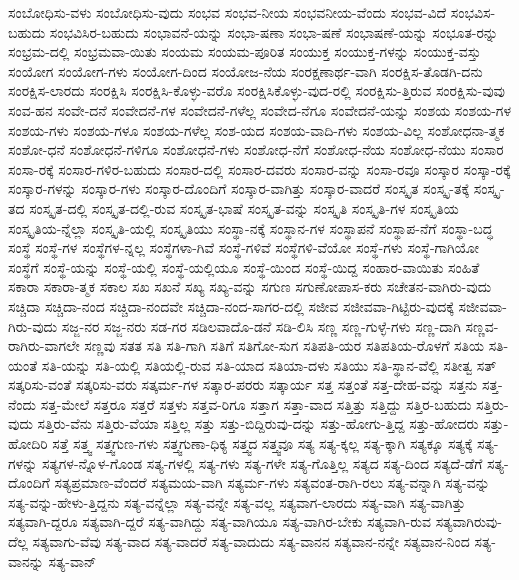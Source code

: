 {ಸಂಬೋಧಿಸು-ವಳು
ಸಂಬೋಧಿಸು-ವುದು
ಸಂಭವ
ಸಂಭವ-ನೀಯ
ಸಂಭವನೀಯ-ವೆಂದು
ಸಂಭವ-ವಿದೆ
ಸಂಭವಿಸ-ಬಹುದು
ಸಂಭವಿಸಿರ-ಬಹುದು
ಸಂಭಾವನೆ-ಯನ್ನು
ಸಂಭಾ-ಷಣಾ
ಸಂಭಾ-ಷಣೆ
ಸಂಭಾಷಣೆ-ಯನ್ನು
ಸಂಭೂತ-ರನ್ನು
ಸಂಭ್ರಮ-ದಲ್ಲಿ
ಸಂಭ್ರಮವಾ-ಯಿತು
ಸಂಯಮ
ಸಂಯಮ-ಪೂರಿತ
ಸಂಯುಕ್ತ
ಸಂಯುಕ್ತ-ಗಳನ್ನು
ಸಂಯುಕ್ತ-ವಸ್ತು
ಸಂಯೋಗ
ಸಂಯೋಗ-ಗಳು
ಸಂಯೋಗ-ದಿಂದ
ಸಂಯೋಜ-ನೆಯ
ಸಂರಕ್ಷಣಾರ್ಥ-ವಾಗಿ
ಸಂರಕ್ಷಿಸ-ತೊಡಗಿ-ದನು
ಸಂರಕ್ಷಿಸ-ಲಾರದು
ಸಂರಕ್ಷಿಸಿ
ಸಂರಕ್ಷಿಸಿ-ಕೊಳ್ಳು-ವರೊ
ಸಂರಕ್ಷಿಸಿಕೊಳ್ಳು-ವುದ-ರಲ್ಲಿ
ಸಂರಕ್ಷಿಸು-ತ್ತಿರುವ
ಸಂರಕ್ಷಿಸು-ವುವು
ಸಂವ-ಹನ
ಸಂವೇ-ದನೆ
ಸಂವೇದನೆ-ಗಳ
ಸಂವೇದನೆ-ಗಳೆಲ್ಲ
ಸಂವೇದ-ನೆಗೂ
ಸಂವೇದನೆ-ಯನ್ನು
ಸಂಶಯ
ಸಂಶಯ-ಗಳ
ಸಂಶಯ-ಗಳು
ಸಂಶಯ-ಗಳೂ
ಸಂಶಯ-ಗಳೆಲ್ಲ
ಸಂಶ-ಯದ
ಸಂಶಯ-ವಾದಿ-ಗಳು
ಸಂಶಯ-ವಿಲ್ಲ
ಸಂಶೋಧನಾ-ತ್ಮಕ
ಸಂಶೋ-ಧನೆ
ಸಂಶೋಧನೆ-ಗಳಿಗೂ
ಸಂಶೋಧನೆ-ಗಳು
ಸಂಶೋಧ-ನೆಗೆ
ಸಂಶೋಧ-ನೆಯ
ಸಂಶೋಧ-ನೆಯು
ಸಂಸಾರ
ಸಂಸಾ-ರಕ್ಕೆ
ಸಂಸಾರ-ಗಳಿರ-ಬಹುದು
ಸಂಸಾರ-ದಲ್ಲಿ
ಸಂಸಾರ-ದವರು
ಸಂಸಾರ-ವನ್ನು
ಸಂಸಾ-ರವೂ
ಸಂಸ್ಕಾರ
ಸಂಸ್ಕಾ-ರಕ್ಕೆ
ಸಂಸ್ಕಾರ-ಗಳನ್ನು
ಸಂಸ್ಕಾರ-ಗಳು
ಸಂಸ್ಕಾರ-ದೊಂದಿಗೆ
ಸಂಸ್ಕಾರ-ವಾಗಿತ್ತು
ಸಂಸ್ಕಾರ-ವಾದರೆ
ಸಂಸ್ಕೃತ
ಸಂಸ್ಕೃ-ತಕ್ಕೆ
ಸಂಸ್ಕೃ-ತದ
ಸಂಸ್ಕೃತ-ದಲ್ಲಿ
ಸಂಸ್ಕೃತ-ದಲ್ಲಿ-ರುವ
ಸಂಸ್ಕೃತ-ಭಾಷೆ
ಸಂಸ್ಕೃತ-ವನ್ನು
ಸಂಸ್ಕೃತಿ
ಸಂಸ್ಕೃತಿ-ಗಳ
ಸಂಸ್ಕೃತಿಯ
ಸಂಸ್ಕೃತಿಯ-ನ್ನೆಲ್ಲಾ
ಸಂಸ್ಕೃತಿ-ಯಲ್ಲಿ
ಸಂಸ್ಕೃತಿಯು
ಸಂಸ್ಥಾ-ನಕ್ಕೆ
ಸಂಸ್ಥಾನ-ಗಳ
ಸಂಸ್ಥಾಪನೆ
ಸಂಸ್ಥಾಪ-ನೆಗೆ
ಸಂಸ್ಥಾ-ಬದ್ಧ
ಸಂಸ್ಥೆ
ಸಂಸ್ಥೆ-ಗಳ
ಸಂಸ್ಥೆಗಳ-ನ್ನಲ್ಲ
ಸಂಸ್ಥೆಗಳಾ-ಗಿವೆ
ಸಂಸ್ಥೆ-ಗಳಿವೆ
ಸಂಸ್ಥೆಗಳಿ-ವೆಯೋ
ಸಂಸ್ಥೆ-ಗಳು
ಸಂಸ್ಥೆ-ಗಾಗಿಯೋ
ಸಂಸ್ಥೆಗೆ
ಸಂಸ್ಥೆ-ಯನ್ನು
ಸಂಸ್ಥೆ-ಯಲ್ಲಿ
ಸಂಸ್ಥೆ-ಯಲ್ಲಿಯೂ
ಸಂಸ್ಥೆ-ಯಿಂದ
ಸಂಸ್ಥೆ-ಯಿದ್ದ
ಸಂಹಾರ-ವಾಯಿತು
ಸಂಹಿತೆ
ಸಕಾರಾ
ಸಕಾರಾ-ತ್ಮಕ
ಸಕಾಲ
ಸಖ
ಸಖನೆ
ಸಖ್ಯ
ಸಖ್ಯ-ವನ್ನು
ಸಗುಣ
ಸಗುಣೋಪಾಸ-ಕರು
ಸಚೇತನ-ವಾಗಿರು-ವುದು
ಸಚ್ಚಿದಾ
ಸಚ್ಚಿದಾ-ನಂದ
ಸಚ್ಚಿದಾ-ನಂದವೇ
ಸಚ್ಚಿದಾ-ನಂದ-ಸಾಗರ-ದಲ್ಲಿ
ಸಜೀವ
ಸಜೀವವಾ-ಗಿಟ್ಟಿರು-ವುದಕ್ಕೆ
ಸಜೀವವಾ-ಗಿರು-ವುದು
ಸಜ್ಜ-ನರ
ಸಜ್ಜ-ನರು
ಸಡ-ಗರ
ಸಡಿಲವಾದೊ-ಡನೆ
ಸಡಿ-ಲಿಸಿ
ಸಣ್ಣ
ಸಣ್ಣ-ಗುಳ್ಳೆ-ಗಳು
ಸಣ್ಣ-ದಾಗಿ
ಸಣ್ಣವ-ರಾಗಿರು-ವಾಗಲೇ
ಸಣ್ಣವು
ಸತತ
ಸತಿ
ಸತಿ-ಗಾಗಿ
ಸತಿಗೆ
ಸತಿಗೋ-ಸುಗ
ಸತಿಪತಿ-ಯರ
ಸತಿಪತಿಯ-ರೊಳಗೆ
ಸತಿಯ
ಸತಿ-ಯಂತೆ
ಸತಿ-ಯನ್ನು
ಸತಿ-ಯಲ್ಲಿ
ಸತಿಯಲ್ಲಿ-ರುವ
ಸತಿ-ಯಾದ
ಸತಿಯಾ-ದಳು
ಸತಿಯು
ಸತಿ-ಸ್ಥಾನ-ವೆಲ್ಲಿ
ಸತೀತ್ವ
ಸತ್
ಸತ್ಕರಿಸು-ವಂತೆ
ಸತ್ಕರಿಸು-ವರು
ಸತ್ಕರ್ಮ-ಗಳ
ಸತ್ಕಾರ-ಪರರು
ಸತ್ಕಾರ್ಯ
ಸತ್ತ
ಸತ್ತಂತೆ
ಸತ್ತ-ದೇಹ-ವನ್ನು
ಸತ್ತನು
ಸತ್ತ-ನೆಂದು
ಸತ್ತ-ಮೇಲೆ
ಸತ್ತರೂ
ಸತ್ತರೆ
ಸತ್ತಳು
ಸತ್ತವ-ರಿಗೂ
ಸತ್ತಾಗ
ಸತ್ತಾ-ವಾದ
ಸತ್ತಿತ್ತು
ಸತ್ತಿದ್ದು
ಸತ್ತಿರ-ಬಹುದು
ಸತ್ತಿರು-ವುದು
ಸತ್ತಿರು-ವೆನು
ಸತ್ತಿರು-ವೆಯಾ
ಸತ್ತಿಲ್ಲ
ಸತ್ತು
ಸತ್ತು-ಬಿದ್ದಿರುವು-ದನ್ನು
ಸತ್ತು-ಹೋಗು-ತ್ತಿದ್ದ
ಸತ್ತು-ಹೋದರು
ಸತ್ತು-ಹೋದಿರಿ
ಸತ್ತೆ
ಸತ್ತ್ವ
ಸತ್ತ್ವಗುಣ-ಗಳು
ಸತ್ತ್ವಗುಣಾ-ಧಿಕ್ಯ
ಸತ್ತ್ವದ
ಸತ್ತ್ವವೂ
ಸತ್ಯ
ಸತ್ಯ-ಕ್ಕಲ್ಲ
ಸತ್ಯ-ಕ್ಕಾಗಿ
ಸತ್ಯಕ್ಕೂ
ಸತ್ಯಕ್ಕೆ
ಸತ್ಯ-ಗಳನ್ನು
ಸತ್ಯಗಳ-ನ್ನೊಳ-ಗೊಂಡ
ಸತ್ಯ-ಗಳಲ್ಲಿ
ಸತ್ಯ-ಗಳು
ಸತ್ಯ-ಗಳೇ
ಸತ್ಯ-ಗೊತ್ತಿಲ್ಲ
ಸತ್ಯದ
ಸತ್ಯ-ದಿಂದ
ಸತ್ಯದೆ-ಡೆಗೆ
ಸತ್ಯ-ದೊಂದಿಗೆ
ಸತ್ಯಪ್ರಮಾಣ-ವೆಂದರೆ
ಸತ್ಯಮಯ-ವಾಗಿ
ಸತ್ಯರ್ಮ-ಗಳು
ಸತ್ಯವಂತ-ರಾಗಿ-ರಲು
ಸತ್ಯ-ವನ್ನಾಗಿ
ಸತ್ಯ-ವನ್ನು
ಸತ್ಯ-ವನ್ನು-ಹೇಳು-ತ್ತಿದ್ದನು
ಸತ್ಯ-ವನ್ನೆಲ್ಲಾ
ಸತ್ಯ-ವನ್ನೇ
ಸತ್ಯ-ವಲ್ಲ
ಸತ್ಯವಾಗ-ಲಾರದು
ಸತ್ಯ-ವಾಗಿ
ಸತ್ಯ-ವಾಗಿತ್ತು
ಸತ್ಯವಾಗಿ-ದ್ದರೂ
ಸತ್ಯವಾಗಿ-ದ್ದರೆ
ಸತ್ಯ-ವಾಗಿದ್ದು
ಸತ್ಯ-ವಾಗಿಯೂ
ಸತ್ಯ-ವಾಗಿರ-ಬೇಕು
ಸತ್ಯವಾಗಿ-ರುವ
ಸತ್ಯವಾಗಿರುವು-ದೆಲ್ಲ
ಸತ್ಯವಾಗು-ವೆವು
ಸತ್ಯ-ವಾದ
ಸತ್ಯ-ವಾದರೆ
ಸತ್ಯ-ವಾದುದು
ಸತ್ಯ-ವಾನನ
ಸತ್ಯವಾನ-ನನ್ನೇ
ಸತ್ಯವಾನ-ನಿಂದ
ಸತ್ಯ-ವಾನನ್ನು
ಸತ್ಯ-ವಾನ್
}
